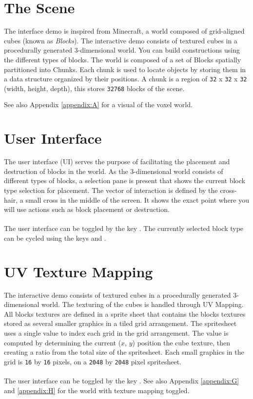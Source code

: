 \documentclass{book}
\begin{document}
\section{The Scene}
The interface demo is inspired from Minecraft, a world composed of grid-aligned cubes (known as \textit{Blocks}).  The interactive demo consists of textured cubes in a procedurally generated 3-dimensional world.  You can build constructions using the different types of blocks.  The world is composed of a set of Blocks spatially partitioned into Chunks.  Each chunk is used to locate objects by storing them in a data structure organized by their positions.   A chunk is a region of \texttt{32} x \texttt{32} x \texttt{32} (width, height, depth), this stores \texttt{32768} blocks of the scene.
  
See also Appendix \ref{appendix:A} for a visual of the voxel world.
  
\section{User Interface}
The user interface (UI) serves the purpose of facilitating the placement and destruction of blocks in the world.  As the 3-dimensional world consists of different types of blocks, a selection pane is present that shows the current block type selection for placement.  The vector of interaction is defined by the cross-hair, a small cross in the middle of the screen.  It shows the exact point where you will use actions such as block placement or destruction.
\\\\
The user interface can be toggled by the key .  The currently selected block type can be cycled using the keys  and .

\section{UV Texture Mapping}
The interactive demo consists of textured cubes in a procedurally generated 3-dimensional world.  The texturing of the cubes is handled through UV Mapping.  All blocks textures are defined in a sprite sheet that contains the blocks textures stored as several smaller graphics in a tiled grid arrangement.  The spritesheet uses a single value to index each grid in the grid arrangement.  The value is computed by determining the current ($x$, $y$) position the cube texture, then creating a ratio from the total size of the spritesheet.  Each small graphics in the grid is \texttt{16} by \texttt{16} pixels, on a \texttt{2048} by \texttt{2048} pixel spritesheet.
\\\\
The user interface can be toggled by the key .  See also Appendix \ref{appendix:G} and \ref{appendix:H} for the world with texture mapping toggled.
    
\end{document}
